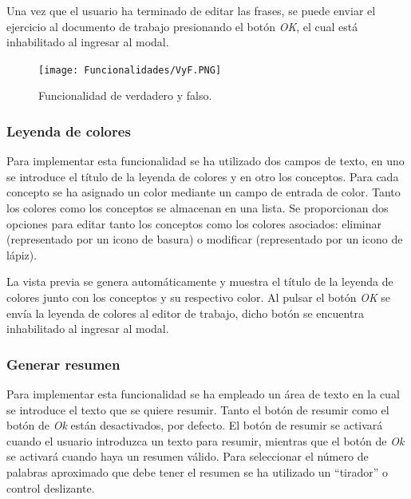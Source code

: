 Una vez que el usuario ha terminado de editar las frases, se puede enviar el ejercicio al documento de trabajo presionando el botón \textit{OK}, el cual está inhabilitado al ingresar al modal.

\begin{figure}[ht!]
  \centering
  \texttt{[image: Funcionalidades/VyF.PNG]}
  \caption{Funcionalidad de verdadero y falso.}
  \label{fig:vyf}
\end{figure}

\subsubsection{Leyenda de colores}
\label{sec:funcioVF}
Para implementar esta funcionalidad se ha utilizado dos campos de texto, en uno se introduce el título de la leyenda de colores y en otro los conceptos. Para cada concepto se ha asignado un color mediante un campo de entrada de color. Tanto los colores como los conceptos se almacenan en una lista. Se proporcionan dos opciones para editar tanto los conceptos como los colores asociados: eliminar (representado por un icono de basura) o modificar (representado por un icono de lápiz). 

La vista previa se genera automáticamente y muestra el título de la leyenda de colores junto con los conceptos y su respectivo color. Al pulsar el botón \textit{OK} se envía la leyenda de colores al editor de trabajo, dicho botón se encuentra inhabilitado al ingresar al modal.

\subsubsection{Generar resumen}
\label{sec:impresumen}
Para implementar esta funcionalidad se ha empleado un área de texto en la cual se introduce el texto que se quiere resumir. Tanto el botón de resumir como el botón de \textit{Ok} están desactivados, por defecto. El botón de resumir se activará cuando el usuario introduzca un texto para resumir, mientras que el botón de \textit{Ok} se activará cuando haya un resumen válido. Para seleccionar el número de palabras aproximado que debe tener el resumen se ha utilizado un ``tirador'' o control deslizante.

